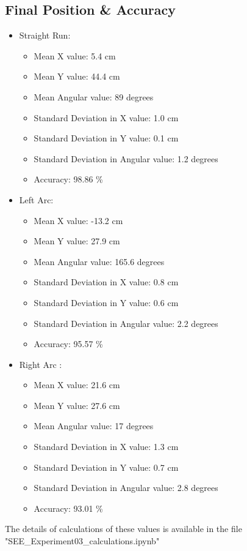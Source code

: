 \documentclass[10pt,a4paper]{article}
\begin{document}
			\subsection{Final Position \& Accuracy }
			\begin{itemize}
				\item Straight Run:		
					\begin{itemize}
						\item Mean X value: 5.4 cm
						\item Mean Y value: 44.4 cm
						\item Mean Angular value: 89 degrees
						\item Standard Deviation in X value: 1.0 cm
						\item Standard Deviation in Y value: 0.1 cm
						\item Standard Deviation in Angular value: 1.2 degrees
						\item Accuracy: 98.86 \%
					\end{itemize}
				\item Left Arc:
					\begin{itemize}
						\item Mean X value: -13.2 cm
						\item Mean Y value: 27.9 cm
						\item Mean Angular value: 165.6 degrees
						\item Standard Deviation in X value: 0.8 cm
						\item Standard Deviation in Y value: 0.6 cm
						\item Standard Deviation in Angular value: 2.2 degrees
						\item Accuracy: 95.57 \%
					\end{itemize}
				\item Right Arc	:
					\begin{itemize}
						\item Mean X value: 21.6 cm
						\item Mean Y value: 27.6 cm
						\item Mean Angular value: 17 degrees
						\item Standard Deviation in X value: 1.3 cm
						\item Standard Deviation in Y value: 0.7 cm
						\item Standard Deviation in Angular value: 2.8 degrees
						\item Accuracy: 93.01 \%
					\end{itemize}	
			\end{itemize}
			The details of calculations of these values is available in the file "SEE\_Experiment03\_calculations.ipynb"
\end{document}
